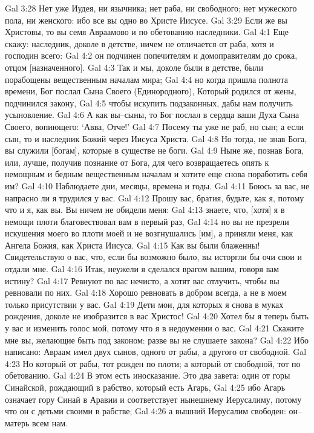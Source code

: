 Gal 3:28  Нет уже Иудея, ни язычника; нет раба, ни свободного; нет мужеского пола, ни женского: ибо все вы одно во Христе Иисусе.
Gal 3:29  Если же вы Христовы, то вы семя Авраамово и по обетованию наследники.
Gal 4:1  Еще скажу: наследник, доколе в детстве, ничем не отличается от раба, хотя и господин всего:
Gal 4:2  он подчинен попечителям и домоправителям до срока, отцом [назначенного].
Gal 4:3  Так и мы, доколе были в детстве, были порабощены вещественным началам мира;
Gal 4:4  но когда пришла полнота времени, Бог послал Сына Своего (Единородного), Который родился от жены, подчинился закону,
Gal 4:5  чтобы искупить подзаконных, дабы нам получить усыновление.
Gal 4:6  А как вы--сыны, то Бог послал в сердца ваши Духа Сына Своего, вопиющего: `Авва, Отче!'
Gal 4:7  Посему ты уже не раб, но сын; а если сын, то и наследник Божий через Иисуса Христа.
Gal 4:8  Но тогда, не знав Бога, вы служили [богам], которые в существе не боги.
Gal 4:9  Ныне же, познав Бога, или, лучше, получив познание от Бога, для чего возвращаетесь опять к немощным и бедным вещественным началам и хотите еще снова поработить себя им?
Gal 4:10  Наблюдаете дни, месяцы, времена и годы.
Gal 4:11  Боюсь за вас, не напрасно ли я трудился у вас.
Gal 4:12  Прошу вас, братия, будьте, как я, потому что и я, как вы. Вы ничем не обидели меня:
Gal 4:13  знаете, что, [хотя] я в немощи плоти благовествовал вам в первый раз,
Gal 4:14  но вы не презрели искушения моего во плоти моей и не возгнушались [им], а приняли меня, как Ангела Божия, как Христа Иисуса.
Gal 4:15  Как вы были блаженны! Свидетельствую о вас, что, если бы возможно было, вы исторгли бы очи свои и отдали мне.
Gal 4:16  Итак, неужели я сделался врагом вашим, говоря вам истину?
Gal 4:17  Ревнуют по вас нечисто, а хотят вас отлучить, чтобы вы ревновали по них.
Gal 4:18  Хорошо ревновать в добром всегда, а не в моем только присутствии у вас.
Gal 4:19  Дети мои, для которых я снова в муках рождения, доколе не изобразится в вас Христос!
Gal 4:20  Хотел бы я теперь быть у вас и изменить голос мой, потому что я в недоумении о вас.
Gal 4:21  Скажите мне вы, желающие быть под законом: разве вы не слушаете закона?
Gal 4:22  Ибо написано: Авраам имел двух сынов, одного от рабы, а другого от свободной.
Gal 4:23  Но который от рабы, тот рожден по плоти; а который от свободной, тот по обетованию.
Gal 4:24  В этом есть иносказание. Это два завета: один от горы Синайской, рождающий в рабство, который есть Агарь,
Gal 4:25  ибо Агарь означает гору Синай в Аравии и соответствует нынешнему Иерусалиму, потому что он с детьми своими в рабстве;
Gal 4:26  а вышний Иерусалим свободен: он--матерь всем нам.
